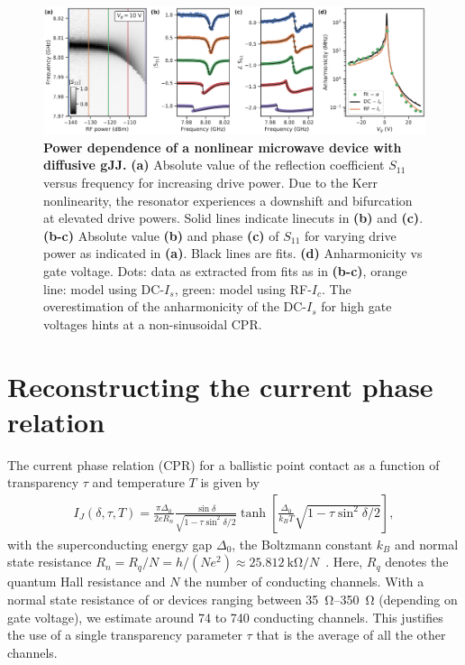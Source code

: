 \begin{figure}
	\centering
	\includegraphics[width=\linewidth]{chapter-gJJ-CPR/figs/Figure4}
	\caption{
		\textbf{Power dependence of a nonlinear microwave device with diffusive gJJ.}
		\textbf{(a)} Absolute value of the reflection coefficient $S_{11}$ versus frequency for increasing drive power.
		Due to the Kerr nonlinearity, the resonator experiences a downshift and bifurcation at elevated drive powers.
		Solid lines indicate linecuts in \textbf{(b)} and \textbf{(c)}.
		\textbf{(b-c)} Absolute value \textbf{(b)} and phase \textbf{(c)} of $S_{11}$ for varying drive power as indicated in \textbf{(a)}.
		Black lines are fits.
		\textbf{(d)} Anharmonicity vs gate voltage.
		Dots: data as extracted from fits as in \textbf{(b-c)}, orange line: model using DC-$I_s$, green: model using RF-$I_c$.
		The overestimation of the anharmonicity of the DC-$I_s$ for high gate voltages hints at a non-sinusoidal CPR.
	}
	\label{fig:figure4}
\end{figure}

\section{Reconstructing the current phase relation}

The current phase relation (CPR) for a ballistic point contact as a function of transparency $\tau$ and temperature $T$ is given by
%
\begin{align}
I_J(\delta,\tau,T) = \frac{\pi\Delta_0}{2 e R_n} \frac{\sin\delta}{\sqrt{1 - \tau \sin^2\delta / 2}} \tanh\left[\frac{\Delta_0}{k_B T} \sqrt{1 - \tau \sin^2\delta / 2}\right],
\label{eq:CPR-ball}
\end{align}
%
with the superconducting energy gap $\Delta_0$, the Boltzmann constant $k_B$ and normal state resistance $R_n= R_q/N = h/(Ne^2)\approx \SI{25.812}{\kilo\ohm} / N$~\cite{golubovCurrentphaseRelationJosephson2004a}.
%
Here, $R_q$ denotes the quantum Hall resistance and $N$ the number of conducting channels.
%
With a normal state resistance of or devices ranging between \SIrange{35}{350}{\ohm} (depending on gate voltage), we estimate around 74 to 740 conducting channels.
%
This justifies the use of a single transparency parameter $\tau$ that is the average of all the other channels.

